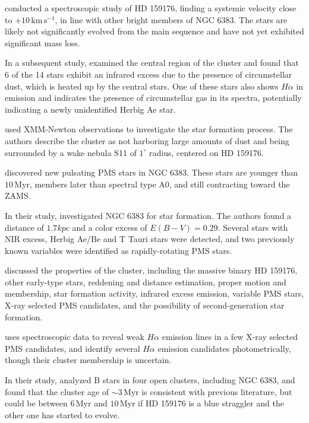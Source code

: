 \documentclass[fleqn,usenatbib,usedcolumn,useAMS]{mnras}
\newcommand{\kms}{\,\textrm{km}\,\textrm{s}^{-1}} %
\begin{document}
\citet{1993Obs...113..204S} conducted a spectroscopic study of HD 159176, finding a systemic velocity close to $+10 \kms$, in line with other bright members of NGC 6383. The stars are likely not significantly evolved from the main sequence and have not yet exhibited significant mass loss.

In a subsequent study, \citet{2000A&A...362..580V} examined the central region of the cluster and found that 6 of the 14 stars exhibit an infrared excess due to the presence of circumstellar dust, which is heated up by the central stars. One of these stars also shows $H\alpha$ in emission and indicates the presence of circumstellar gas in its spectra, potentially indicating a newly unidentified Herbig Ae star.

\citet{2003A&A...407..925R} used XMM-Newton observations to investigate the star formation process. The authors describe the cluster as not harboring large amounts of dust and being surrounded by a wake nebula S11 of $1^\circ$ radius, centered on HD 159176.

\citet{zwintz_marconi_kallinger_weiss_2004,2005MNRAS.357..345Z} discovered new pulsating PMS stars in NGC 6383. These stars are younger than $10\,\textrm{Myr}$, members later than spectral type A0, and still contracting toward the ZAMS.

In their study, \citet{2007A&A...462..157P} investigated NGC 6383 for star formation. The authors found a distance of $1.7 kpc$ and a color excess of $E(B-V) = 0.29$. Several stars with NIR excess, Herbig Ae/Be and T Tauri stars were detected, and two previously known variables were identified as rapidly-rotating PMS stars.

\citet{2008hsf2.book..497R} discussed the properties of the cluster, including the massive binary HD 159176, other early-type stars, reddening and distance estimation, proper motion and membership, star formation activity, infrared excess emission, variable PMS stars, X-ray selected PMS candidates, and the possibility of second-generation star formation.

\citet{2010A&A...511A..25R} uses spectroscopic data to reveal weak $H\alpha$ emission lines in a few X-ray selected PMS candidates, and identify several $H\alpha$ emission candidates photometrically, though their cluster membership is uncertain.

In their study, \citet{2018AA...610A..30A} analyzed B stars in four open clusters, including NGC 6383, and found that the cluster age of $\sim 3\,\textrm{Myr}$ is consistent with previous literature, but could be between $6\,\textrm{Myr}$ and $10\,\textrm{Myr}$ if HD 159176 is a blue straggler and the other one has started to evolve.
\end{document}
